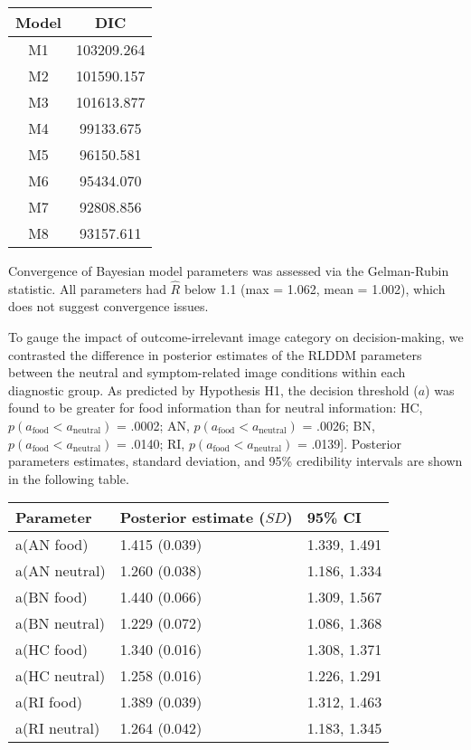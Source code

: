 \documentclass[
  man,floatsintext]{apa6}
\begin{document}
\begin{longtable}[]{@{}cc@{}}
\toprule\noalign{}
Model & DIC \\
\midrule\noalign{}
\endhead
\bottomrule\noalign{}
\endlastfoot
M1 & 103209.264 \\
M2 & 101590.157 \\
M3 & 101613.877 \\
M4 & 99133.675 \\
M5 & 96150.581 \\
M6 & 95434.070 \\
M7 & 92808.856 \\
M8 & 93157.611 \\
\end{longtable}

Convergence of Bayesian model parameters was assessed via the Gelman-Rubin statistic. All parameters had \(\hat{R}\) below 1.1 (max = 1.062, mean = 1.002), which does not suggest convergence issues.

To gauge the impact of outcome-irrelevant image category on decision-making, we contrasted the difference in posterior estimates of the RLDDM parameters between the neutral and symptom-related image conditions within each diagnostic group. As predicted by Hypothesis H1, the decision threshold (\(a\)) was found to be greater for food information than for neutral information: HC, \(p(a_\text{food} < a_\text{neutral})\) = .0002; AN, \(p(a_\text{food} < a_\text{neutral})\) = .0026; BN, \(p(a_\text{food} < a_\text{neutral})\) = .0140; RI, \(p(a_\text{food} < a_\text{neutral})\) = .0139{]}. Posterior parameters estimates, standard deviation, and 95\% credibility intervals are shown in the following table.

\begin{longtable}[]{@{}lll@{}}
\toprule\noalign{}
Parameter & Posterior estimate (\(SD\)) & 95\% CI \\
\midrule\noalign{}
\endhead
\bottomrule\noalign{}
\endlastfoot
a(AN food) & 1.415 (0.039) & 1.339, 1.491 \\
a(AN neutral) & 1.260 (0.038) & 1.186, 1.334 \\
a(BN food) & 1.440 (0.066) & 1.309, 1.567 \\
a(BN neutral) & 1.229 (0.072) & 1.086, 1.368 \\
a(HC food) & 1.340 (0.016) & 1.308, 1.371 \\
a(HC neutral) & 1.258 (0.016) & 1.226, 1.291 \\
a(RI food) & 1.389 (0.039) & 1.312, 1.463 \\
a(RI neutral) & 1.264 (0.042) & 1.183, 1.345 \\
\end{longtable}
\end{document}
